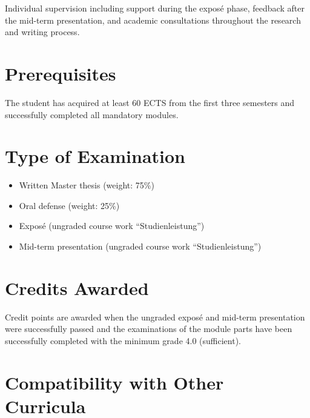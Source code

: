 \documentclass[
  letterpaper,
  10pt,
  openany]{book}
\providecommand{\tightlist}{%
  \setlength{\itemsep}{0pt}\setlength{\parskip}{0pt}}\usepackage{longtable,booktabs,array}
\begin{document}

Individual supervision including support during the exposé phase,
feedback after the mid-term presentation, and academic consultations
throughout the research and writing process.

\section*{Prerequisites}\label{prerequisites-5}


The student has acquired at least 60 ECTS from the first three semesters
and successfully completed all mandatory modules.

\section*{Type of Examination}\label{type-of-examination-5}


\begin{itemize}
\tightlist
\item
  Written Master thesis (weight: 75\%)\\
\item
  Oral defense (weight: 25\%)\\
\item
  Exposé (ungraded course work ``Studienleistung'')\\
\item
  Mid-term presentation (ungraded course work ``Studienleistung'')
\end{itemize}

\section*{Credits Awarded}\label{credits-awarded-5}


Credit points are awarded when the ungraded exposé and mid-term
presentation were successfully passed and the examinations of the module
parts have been successfully completed with the minimum grade 4.0
(sufficient).

\section*{Compatibility with Other
Curricula}\label{compatibility-with-other-curricula-5}
\end{document}
